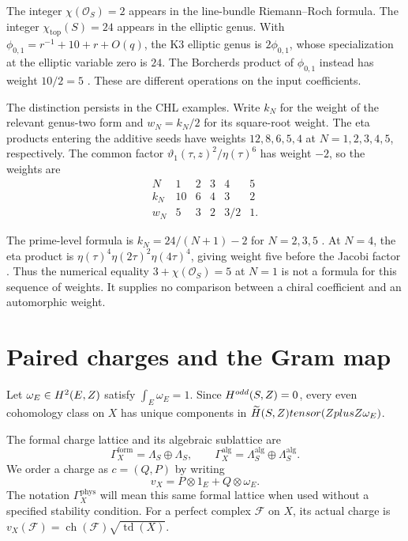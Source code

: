 \begin{remark}
\label{rem:two-K3-Eulers}
The integer $\chi(\mathcal O_S)=2$ appears in the line-bundle
Riemann--Roch formula.  The integer $\chi_{\mathrm{top}}(S)=24$
appears in the elliptic genus.  With
$\phi_{0,1}=r^{-1}+10+r+O(q)$, the K3 elliptic genus is
$2\phi_{0,1}$, whose specialization at the elliptic variable zero
is $24$.  The Borcherds product of $\phi_{0,1}$ instead has weight
$10/2=5$ \cite{EZ:1,Borcherds95,GN}.  These are different operations
on the input coefficients.
\end{remark}

The distinction persists in the CHL examples.  Write $k_N$ for the
weight of the relevant genus-two form and $w_N=k_N/2$ for its
square-root weight.  The eta products entering the additive seeds
have weights $12,8,6,5,4$ at $N=1,2,3,4,5$, respectively.
The common factor $\vartheta_1(\tau,z)^2/\eta(\tau)^6$ has weight
$-2$, so the weights are
\[
\begin{array}{c|ccccc}
N&1&2&3&4&5\\ \hline
k_N&10&6&4&3&2\\
w_N&5&3&2&3/2&1.
\end{array}
\]

The prime-level formula is $k_N=24/(N+1)-2$ for $N=2,3,5$
\cite{JS06Dyon,GK09CHL}.  At $N=4$, the eta product is
$\eta(\tau)^4\eta(2\tau)^2\eta(4\tau)^4$, giving weight five
before the Jacobi factor \cite[Table~1 and (3.17)]{GK10Composite}.
Thus the numerical equality $3+\chi(\mathcal O_S)=5$ at $N=1$
is not a formula for this sequence of weights.  It supplies no
comparison between a chiral coefficient and an automorphic weight.

\section{Paired charges and the Gram map}
\label{subsec:kunneth-formal-mukai}
\label{sec:gram-map-polarization}
\label{subsec:igusa-variables-gram-index}

Let $\omega_E\in H^2(E,Z)$ satisfy $\int_E\omega_E=1$.  Since
$H^{odd}(S,Z)=0$, every even cohomology class on $X$ has
unique components in
$\widetilde H(S,Z)tensor(ZplusZ\omega_E)$.

\begin{definition}
\label{def:formal-even-mukai-sector}
The formal charge lattice and its algebraic sublattice are
\[
\Gamma_X^{\mathrm{form}}=\Lambda_S\oplus\Lambda_S,
\qquad
\Gamma_X^{\mathrm{alg}}=\Lambda_S^{\mathrm{alg}}
\oplus\Lambda_S^{\mathrm{alg}}.
\]
We order a charge as $c=(Q,P)$ by writing
\[
v_X=P\otimes1_E+Q\otimes\omega_E.
\]
The notation $\Gamma_X^{\mathrm{phys}}$ will mean this same formal
lattice when used without a specified stability condition.
For a perfect complex $\mathcal F$ on $X$, its actual charge is
$v_X(\mathcal F)=\operatorname{ch}(\mathcal F)
\sqrt{\operatorname{td}(X)}$.
\end{definition}

